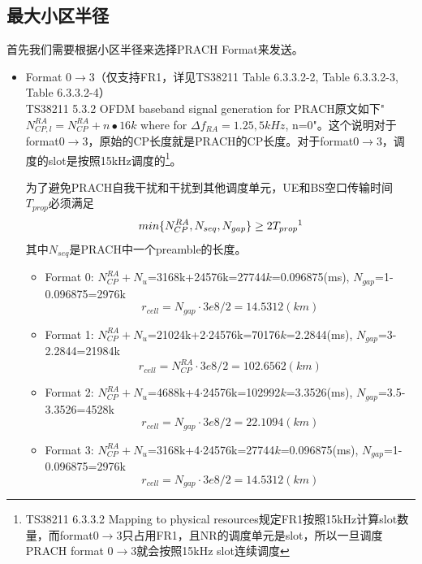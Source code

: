 \documentclass{article}
\begin{document}
\subsection{最大小区半径}
首先我们需要根据小区半径来选择PRACH Format来发送。
\begin{itemize}
\item Format 0$\to$3（仅支持FR1，详见TS38211 Table 6.3.3.2-2, Table 6.3.3.2-3, Table 6.3.3.2-4）\\
TS38211 5.3.2 OFDM baseband signal generation for PRACH原文如下"$N_{CP,l}^{RA}=N_{CP}^{RA}+n∙16k$ where for $\Delta f_{RA}={1.25,5}kHz$, n=0"\cite{38211}。这个说明对于format0$\to$3，原始的CP长度就是PRACH的CP长度。对于format0$\to$3，调度的slot是按照15kHz调度的\footnote{TS38211 6.3.3.2 Mapping to physical resources规定FR1按照15kHz计算slot数量，而format0$\to$3只占用FR1，且NR的调度单元是slot，所以一旦调度PRACH format 0$\to$3就会按照15kHz slot连续调度}。

为了避免PRACH自我干扰和干扰到其他调度单元，UE和BS空口传输时间$T_{prop}$必须满足
\begin{equation}
    min\{N_{CP}^{RA}, N_{seq}, N_{gap}\} \geq 2T_{prop}\footnotemark
\end{equation}
其中$N_{seq}$是PRACH中一个preamble的长度。

\begin{itemize}
\item Format 0: $N_{CP}^{RA} + N_u$=3168k+24576k=27744$k$=0.096875(ms), $N_{gap}$=1-0.096875=2976k\\
\[
r_{cell} = N_{gap}\cdot 3e8/2=14.5312(km)
\]
\item Format 1: $N_{CP}^{RA} + N_u$=21024k+2$\cdot$24576k=70176$k$=2.2844(ms), $N_{gap}$=3-2.2844=21984k
\[
r_{cell} = N_{CP}^{RA}\cdot 3e8/2=102.6562(km)
\]
\item Format 2: $N_{CP}^{RA} + N_u$=4688k+4$\cdot$24576k=102992$k$=3.3526(ms), $N_{gap}$=3.5-3.3526=4528k
\[
r_{cell} = N_{gap}\cdot 3e8/2=22.1094(km)
\]
\item Format 3: $N_{CP}^{RA} + N_u$=3168k+4$\cdot$24576k=27744$k$=0.096875(ms), $N_{gap}$=1-0.096875=2976k
\[
r_{cell} = N_{gap}\cdot 3e8/2=14.5312(km)
\]
\end{itemize}


\end{itemize}
\end{document}
